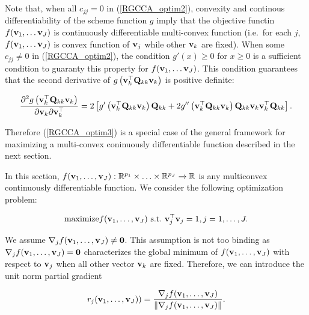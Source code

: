 \documentclass[
]{jss}
\begin{document}
Note that, when all \(c_{jj} = 0\) in (\ref{RGCCA_optim2}), convexity
and continous differentiability of the scheme function \(g\) imply that
the objective functin \(f(\mathbf{v}_1, \ldots \mathbf{v}_J)\) is continuously
differentiable multi-convex function (i.e.~for each \(j\),
\(f(\mathbf{v}_1, \ldots \mathbf{v}_J)\) is convex function of \(\mathbf{v}_j\) while
other \(\mathbf{v}_k\) are fixed). When some \(c_{jj} \neq 0\) in
(\ref{RGCCA_optim2}), the condition \(g'(x) \geq 0\) for \(x \geq 0\) is
a sufficient condition to guaranty this property for
\(f(\mathbf{v}_1, \ldots \mathbf{v}_J)\). This condition guarantees that the
second derivative of \(g\left(\mathbf{v}_k^\top \mathbf{Q}_{kk} \mathbf{v}_k \right)\)
is positive definite:

\begin{equation}
\frac{\partial^2 g\left(\mathbf{v}_k^\top \mathbf{Q}_{kk} \mathbf{v}_k \right)}{\partial \mathbf{v}_k \partial \mathbf{v}_k^\top} = 2 \left[ g'\left(\mathbf{v}_k^\top \mathbf{Q}_{kk} \mathbf{v}_k \right)\mathbf{Q}_{kk} + 2 g''\left(\mathbf{v}_k^\top \mathbf{Q}_{kk} \mathbf{v}_k\right) \mathbf{Q}_{kk}\mathbf{v}_k\mathbf{v}_k^\top\mathbf{Q}_{kk} \right]. 
\end{equation}

Therefore (\ref{RGCCA_optim3}) is a special case of the general
framework for maximizing a multi-convex coninuously differentiable
function described in the next section.

In this section,
\(f(\mathbf{v}_1, \ldots,\mathbf{v}_J):\mathbb{R}^{p_1}\times \ldots \times \mathbb{R}^{p_J} \xrightarrow{}\mathbb{R}\)
is any multiconvex continuously differentiable function. We consider the
following optimization problem:

\begin{equation}
\text{maximize} f(\mathbf{v}_1, \ldots,\mathbf{v}_J) \text{~s.t.~} \mathbf{v}_j^\top \mathbf{v}_j = 1, j=1, \ldots, J.
\label{optim_general}
\end{equation}

\begin{sloppypar}
We assume $\mathbf{\nabla}_j f(\mathbf{v}_1, \ldots,\mathbf{v}_J) \neq \mathbf 0$. This 
assumption is not too binding as 
$\mathbf{\nabla}_j f(\mathbf{v}_1, \ldots,\mathbf{v}_J) = \mathbf 0$ characterizes the global 
minimum of $f(\mathbf{v}_1, \ldots,\mathbf{v}_J)$ with respect to $\mathbf{v}_j$ when all other 
vector $\mathbf{v}_k$ are fixed. Therefore, we can introduce the unit norm partial 
gradient
\end{sloppypar}

\begin{equation}
r_j(\mathbf{v}_1, \ldots,\mathbf{v}_J)) = \frac{\mathbf{\nabla}_j f(\mathbf{v}_1, \ldots,\mathbf{v}_J)}{\Vert \mathbf{\nabla}_j f(\mathbf{v}_1, \ldots,\mathbf{v}_J) \Vert}.
\end{equation}
\end{document}
